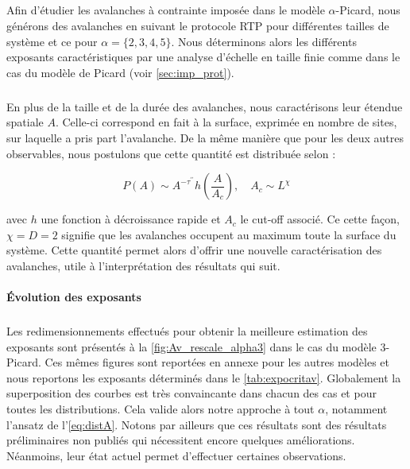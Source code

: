 \subparagraph{}Afin d'étudier les avalanches à contrainte imposée dans le modèle $\alpha$-Picard, nous générons des avalanches en suivant le protocole RTP pour différentes tailles de système et ce pour $\alpha = \{2, 3, 4, 5\}$. Nous déterminons alors les différents exposants caractéristiques par une analyse d'échelle en taille finie comme dans le cas du modèle de Picard (voir \autoref{sec:imp_prot}). 

\subparagraph{}En plus de la taille et de la durée des avalanches, nous caractérisons leur étendue spatiale $A$. Celle-ci correspond en fait à la surface, exprimée en nombre de sites, sur laquelle a pris part l'avalanche. De la même manière que pour les deux autres observables, nous postulons que cette quantité est distribuée selon :

\begin{equation}
	P(A) \sim A^{-\tau^{\prime\prime}}h\left( \frac{A}{A_c} \right),\quad A_c \sim L^\chi
	\label{eq:distA}
\end{equation}

\noindent avec $h$ une fonction à décroissance rapide et $A_c$ le cut-off associé. Ce cette façon, $\chi=D=2$ signifie que les avalanches occupent au maximum toute la surface du système. Cette quantité permet alors d'offrir une nouvelle caractérisation des avalanches, utile à l'interprétation des résultats qui suit.

\paragraph{\'Evolution des exposants}

\subparagraph{}Les redimensionnements effectués pour obtenir la meilleure estimation des exposants sont présentés à la \autoref{fig:Av_rescale_alpha3} dans le cas du modèle 3-Picard. Ces mêmes figures sont reportées en annexe pour les autres modèles et nous reportons les exposants déterminés dans le \autoref{tab:expocritav}. Globalement la superposition des courbes est très convaincante dans chacun des cas et pour toutes les distributions. Cela valide alors notre approche à tout $\alpha$, notamment l'ansatz de l'\autoref{eq:distA}. Notons par ailleurs que ces résultats sont des résultats préliminaires non publiés qui nécessitent encore quelques améliorations. Néanmoins, leur état actuel permet d'effectuer certaines observations.

